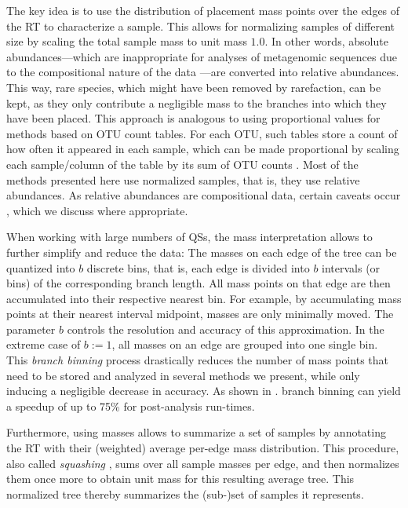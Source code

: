 The key idea is to use the distribution of placement mass points over the edges of the \ac{RT} to characterize a sample.
This allows for normalizing samples of different size
by scaling the total sample mass to unit mass $1.0$.
In other words, absolute abundances---which are inappropriate for analyses
of metagenomic sequences due to the compositional nature of the data \cite{Gloor2017}---are converted into relative abundances.
This way, rare species, which might have been removed by rarefaction, can be kept,
as they only contribute a negligible mass to the branches into which they have been placed.
This approach is analogous to using proportional values for methods based on OTU count tables.
For each OTU, such tables store a count of how often it appeared in each sample,
which can be made proportional by scaling each sample/column of the table by its sum of OTU counts \cite{Weiss2017}.
Most of the methods presented here use normalized samples, that is, they use relative abundances.
As relative abundances are compositional data, certain caveats occur \cite{Aitchison1986,Lovell2015,Gloor2016},
which we discuss where appropriate.

When working with large numbers of \acp{QS},
the mass interpretation allows to further simplify and reduce the data:
The masses on each edge of the tree can be quantized into $b$ discrete bins,
that is, each edge is divided into $b$ intervals (or bins) of the corresponding branch length.
All mass points on that edge are then accumulated into their respective nearest bin.
For example, by accumulating mass points at their nearest interval midpoint, masses are only minimally moved.
The parameter $b$ controls the resolution and accuracy of this approximation.
In the extreme case of $b:=1$, all masses on an edge are grouped into one single bin.
This \emph{branch binning} process drastically reduces the number of mass points
that need to be stored and analyzed in several methods we present,
while only inducing a negligible decrease in accuracy.
As shown in .
branch binning can yield a speedup of up to 75\% for post-analysis run-times.

Furthermore, using masses allows to summarize a set of samples
by annotating the \ac{RT} with their (weighted) average per-edge mass distribution.
This procedure, also called \emph{squashing} \cite{Matsen2011a}, sums over all sample masses per edge,
and then normalizes them once more to obtain unit mass for this resulting average tree.
This normalized tree thereby summarizes the (sub-)set of samples it represents.

